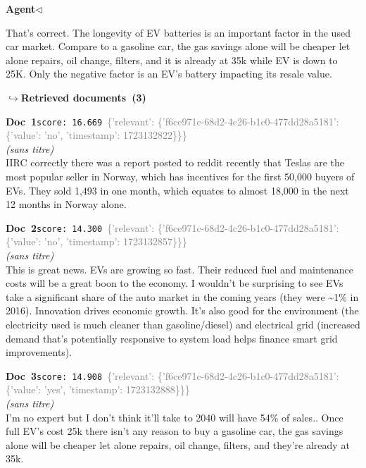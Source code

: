\documentclass[a4paper,11pt]{article}
\begin{document}
\noindent\hfill{\small\textcolor{agentcolor}{\textbf{Agent\enspace$\triangleleft$}}}
\begin{agentbubble}
That's correct. The longevity of EV batteries is an important factor in the used car market.   Compare to a gasoline car, the gas savings alone will be cheaper let alone repairs, oil change, filters, and it is already at 35k while EV is down to 25K.   Only the negative factor is an EV's battery impacting its resale value. 
\end{agentbubble}
\noindent\hfill{\footnotesize\textcolor{doccolor}{\textbf{$\hookrightarrow$\enspace Retrieved documents~(3)}}}
\begin{docenv}
{\footnotesize\textcolor{doccolor}{\textbf{Doc~1}}}\hfill{\tiny\texttt{score:~16.669}}\ {\tiny\textcolor{gray}{\{'relevant': \{'f6ce971c-68d2-4c26-b1c0-477dd28a5181': \{'value': 'no', 'timestamp': 1723132822\}\}\}}}\\[3pt]
{\small\textit{(sans titre)}}\\[2pt]
\vspace{2pt}
{\footnotesize 
IIRC correctly there was a report posted to reddit recently that Teslas are  the most popular seller in Norway, which has incentives for the first 50,000 buyers of EVs. They sold 1,493 in one month, which equates to almost 18,000 in the next 12 months in Norway alone.}
\end{docenv}
\begin{docenv}
{\footnotesize\textcolor{doccolor}{\textbf{Doc~2}}}\hfill{\tiny\texttt{score:~14.300}}\ {\tiny\textcolor{gray}{\{'relevant': \{'f6ce971c-68d2-4c26-b1c0-477dd28a5181': \{'value': 'no', 'timestamp': 1723132857\}\}\}}}\\[3pt]
{\small\textit{(sans titre)}}\\[2pt]
\vspace{2pt}
{\footnotesize 
This is great news.  EVs are growing so fast.  Their reduced fuel and maintenance costs will be a great boon to the economy.  I wouldn't be surprising to see EVs take a significant share of the auto market in the coming years (they were \textasciitilde{}1\% in 2016).  Innovation drives economic growth.  It's also good for the environment (the electricity used is much cleaner than gasoline/diesel) and electrical grid (increased demand that's potentially responsive to system load helps finance smart grid improvements).}
\end{docenv}
\begin{docenv}
{\footnotesize\textcolor{doccolor}{\textbf{Doc~3}}}\hfill{\tiny\texttt{score:~14.908}}\ {\tiny\textcolor{gray}{\{'relevant': \{'f6ce971c-68d2-4c26-b1c0-477dd28a5181': \{'value': 'yes', 'timestamp': 1723132888\}\}\}}}\\[3pt]
{\small\textit{(sans titre)}}\\[2pt]
\vspace{2pt}
{\footnotesize 
I'm no expert but I don't think it'll take to 2040 will have 54\% of sales.. Once full EV's cost 25k there isn't any reason to buy a gasoline car, the gas savings alone will be cheaper let alone repairs, oil change, filters, and they're already at 35k.}
\end{docenv}
\end{document}
